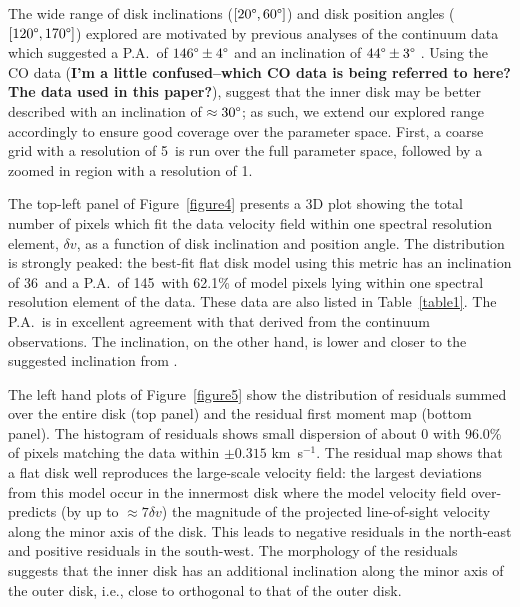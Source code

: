 \documentclass[onecolumn]{aastex6}
\newcommand{\kms}{km~s$^{-1}$}
\begin{document}
The wide range of disk inclinations ($[20\degree,60\degree]$) and disk  position
angles ($[120\degree,170\degree]$) explored are motivated by previous analyses
of the continuum data which suggested a P.A.~of $146\degree \pm 4\degree$   and
an inclination of $44\degree \pm 3\degree$ \citep[see Paper I and][]{pineda14}.
Using the CO data (\textbf{I'm a little confused--which CO data is being
referred to here? The data used in this paper?}), \citet{pineda14} suggest that
the inner disk may be better described  with an inclination of $\approx
30\degree$; as such, we extend our explored range  accordingly to ensure good coverage
over the parameter space.   First, a coarse grid with a resolution of
5\degree~is run over the full parameter space,  followed by a zoomed in region
with a resolution of 1\degree.

The top-left panel of Figure~\ref{figure4} presents a 3D plot showing the 
total number of pixels which fit the data velocity field within one spectral resolution 
element, $\delta v$, as a function of disk inclination and position angle. 
The distribution is strongly peaked: the best-fit flat disk model using this 
metric has an inclination of 36\degree~and a P.A.~of 145\degree~with 62.1\% of model pixels 
lying within one spectral resolution element of the data.  
These data are also listed in Table~\ref{table1}.  
The P.A.~is in excellent agreement with that derived from the continuum observations.  
The inclination, on the other hand, is lower and closer 
to the suggested inclination from \citet{pineda14}.

The left hand plots of Figure~\ref{figure5} show the distribution of residuals
summed  over the entire disk (top panel) and the residual first moment map
(bottom panel).   The histogram of residuals shows small dispersion of about 0
with 96.0\% of pixels  matching the data within $\pm0.315$ \kms.   The residual
map shows that a flat disk well reproduces the large-scale  velocity field: the
largest deviations from this model occur in the innermost  disk where the model
velocity field over-predicts (by up to $\approx 7\delta v$) the magnitude of the
projected line-of-sight velocity along the minor axis of the disk.   This leads
to negative residuals in the north-east  and positive residuals in the
south-west.   The morphology of the residuals suggests that the inner disk has
an  additional inclination along the minor axis of the outer disk, i.e.,  close
to orthogonal to that of the outer disk.  
\end{document}
